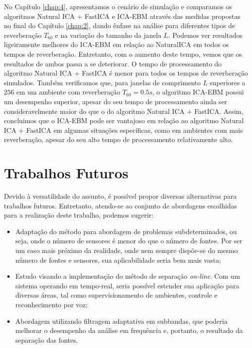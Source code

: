 No Capítulo \ref{chap:4}, apresentamos o cenário de simulação e comparamos os algoritmos Natural ICA + FastICA e ICA-EBM através das medidas propostas no final do Capítulo \ref{chap:2}, dando ênfase na análise para diferentes tipos de reverberação $T_{60}$ e na variação do tamanho da janela $L$. Podemos ver resultados ligeiramente melhores do ICA-EBM em relação ao NaturalICA em todos os tempos de reverberação. Entretanto, com o aumento deste tempo, vemos que os resultados de ambos passa a se deteriorar. O tempo de processamento do algoritmo Natural ICA + FastICA é menor para todos os tempos de reverberação simulados. Também verificamos que, para janelas de comprimento $L$ superiores a $256$ em um ambiente com reverberação $T_{60}=0.5s$, o algoritmo ICA-EBM possui um desempenho superior, apesar do seu tempo de processamento ainda ser consideravelmente maior do que o do algoritmo Natural ICA + FastICA. Assim, concluimos que o ICA-EBM pode ser vantajoso em relação ao algoritmo Natural ICA + FastICA em algumas situações específicas, como em ambientes com mais reverberação, apesar do seu alto tempo de processamento relativamente alto.

\section{Trabalhos Futuros}

Devido à versatilidade do assunto, é possível propor diversas alternativas para trabalhos futuros. Entretanto, atendo-se ao conjunto de abordagens escolhidas para a realização deste trabalho, podemos sugerir:
\begin{itemize}
    \item Adaptação do método para abordagem de problemas subdeterminados, ou seja, onde o número de sensores é menor do que o número de fontes. Por ser um caso mais próximo da realidade, onde nem sempre dispõe-se do mesmo número de fontes e sensores, sua aplicabilidade seria bem mais vasta;
    
    \item Estudo visando a implementação do método de separação \textit{on-line}. Com um sistema operando em tempo-real, seria possível estender sua aplicação para diversas áreas, tal como supervisionamento de ambientes, controle e reconhecimento por voz;
    
    \item Abordagem utilizando filtragem adaptativa em subbandas, que poderia melhorar o desempenho da análise em frequência e, portanto, o resultado da separação das fontes.
\end{itemize}
